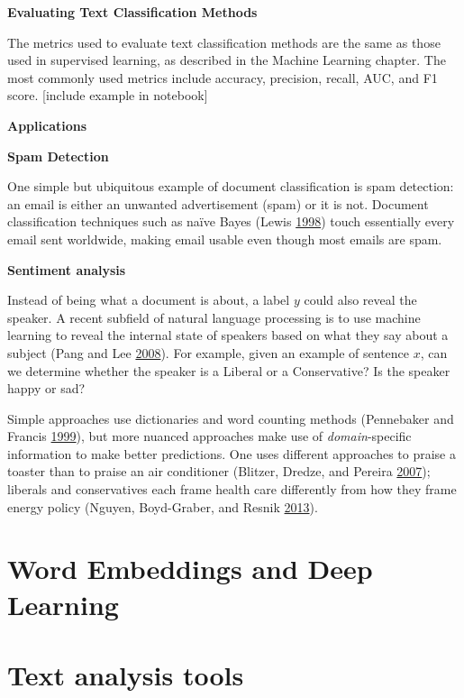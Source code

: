 \documentclass[]{krantz}
\begin{document}
\textbf{Evaluating Text Classification Methods}

The metrics used to evaluate text classification methods are the same as
those used in supervised learning, as described in the Machine Learning
chapter. The most commonly used metrics include accuracy, precision,
recall, AUC, and F1 score. {[}include example in notebook{]}

\textbf{Applications} \vspace*{-2pt}

\textbf{Spam Detection}

One simple but ubiquitous example of document classification is spam
detection: an email is either an unwanted advertisement (spam) or it is
not. Document classification techniques such as naïve Bayes (Lewis
\protect\hyperlink{ref-lewis-05}{1998}) touch essentially every email
sent worldwide, making email usable even though most emails are spam.

\textbf{Sentiment analysis}

Instead of being what a document is about, a label \(y\) could also
reveal the speaker. A recent subfield of natural language processing is
to use machine learning to reveal the internal state of speakers based
on what they say about a subject (Pang and Lee
\protect\hyperlink{ref-pang-08}{2008}). For example, given an example of
sentence \(x\), can we determine whether the speaker is a Liberal or a
Conservative? Is the speaker happy or sad?

Simple approaches use dictionaries and word counting methods (Pennebaker
and Francis \protect\hyperlink{ref-pennebaker-99}{1999}), but more
nuanced approaches make use of \emph{domain}-specific information to
make better predictions. One uses different approaches to praise a
toaster than to praise an air conditioner (Blitzer, Dredze, and Pereira
\protect\hyperlink{ref-blitzer-07}{2007}); liberals and conservatives
each frame health care differently from how they frame energy policy
(Nguyen, Boyd-Graber, and Resnik
\protect\hyperlink{ref-nguyen-13:shlda}{2013}).

\section{Word Embeddings and Deep
Learning}\label{word-embeddings-and-deep-learning}

\section{Text analysis tools}\label{text-analysis-tools}
\end{document}
